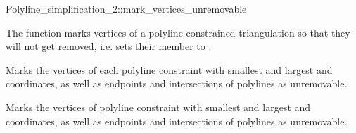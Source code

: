 \ccRefPageBegin

\begin{ccRefFunction}{Polyline_simplification_2::mark_vertices_unremovable}

\ccDefinition

The function \ccRefName{} marks vertices of a polyline constrained triangulation
so that they will not get removed, i.e. sets their  member to .


{
Marks the vertices of each polyline constraint with smallest and largest  and  
coordinates, as well as endpoints and intersections of polylines as unremovable.
}

{
Marks the vertices of polyline constraint  with smallest and largest  and  
coordinates, as well as endpoints and intersections of polylines as unremovable.
}

\ccSeeAlso

\end{ccRefFunction}

\ccRefPageEnd
